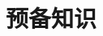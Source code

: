 \documentclass{beamer}
\begin{document}
%		
%		
%	
%	
%		
%		
	
	
	
	\section{预备知识}
	
\end{document}
